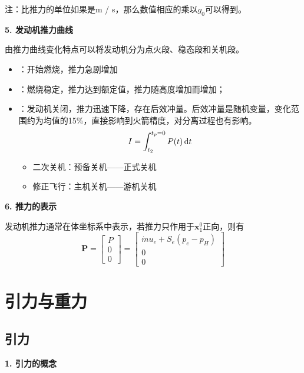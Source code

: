 注：比推力的单位如果是m / s，那么数值相应的乘以$g_0$可以得到。

\vspace*{0.5em}

\noindent \textbf{5. 发动机推力曲线}

由推力曲线变化特点可以将发动机分为点火段、稳态段和关机段。
\vspace*{-1.2em}

\begin{itemize}
	\item {}：开始燃烧，推力急剧增加\vspace*{-0.8em}
	\item {}：燃烧稳定，推力达到额定值，推力随高度增加而增加；\vspace*{-0.8em}
	\item {}：发动机关闭，推力迅速下降，存在后效冲量。后效冲量是随机变量，变化范围约为均值的15\%，直接影响到火箭精度，对分离过程也有影响。
	\begin{equation}
		I = \int_{t_2}^{t_p = 0}P(t)\, {\rm{d}} t
	\end{equation}
	\begin{itemize}
		\item 二次关机：预备关机——正式关机\vspace*{-0.5em}
		\item 修正飞行：主机关机——游机关机
	\end{itemize}
\end{itemize}

\noindent \textbf{6. 推力的表示}

发动机推力通常在体坐标系中表示，若推力只作用于$\bm{x}_1^0$正向，则有
\begin{equation}
	\bm{P} = 
	\begin{bmatrix}
		P \\ 0 \\ 0
	\end{bmatrix}
	= 
	\begin{bmatrix}
		 \dot{m}u_e + S_e(p_e - p_H) \\
		 0 \\
		 0
	\end{bmatrix}
\end{equation}




\section{引力与重力}
\subsection{引力}
\noindent \textbf{1. 引力的概念}

